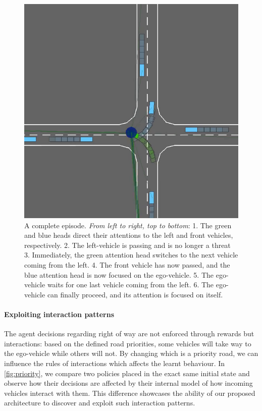 \begin{figure}[tp]
	\includegraphics[width=.32\linewidth]{img/episode6}
	\caption{A complete episode. \emph{From left to right, top to bottom}: 1. The green and blue heads direct their attentions to the left and front vehicles, respectively. 2. The left-vehicle is passing and is no longer a threat 3. Immediately, the green attention head switches to the next vehicle coming from the left. 4. The front vehicle has now passed, and the blue attention head is now focused on the ego-vehicle. 5. The ego-vehicle waits for one last vehicle coming from the left. 6. The ego-vehicle can finally proceed, and its attention is focused on itself.}
	\label{fig:episode}
\end{figure}

\paragraph{Exploiting interaction patterns}

The agent decisions regarding right of way are not enforced through rewards but interactions: based on the defined road priorities, some vehicles will take way to the ego-vehicle while others will not. By changing which is a priority road, we can influence the rules of interactions which affects the learnt behaviour. In \autoref{fig:priority}, we compare two policies placed in the exact same initial state and observe how their decisions are affected by their internal model of how incoming vehicles interact with them. This difference showcases the ability of our proposed architecture to discover and exploit such interaction patterns.

